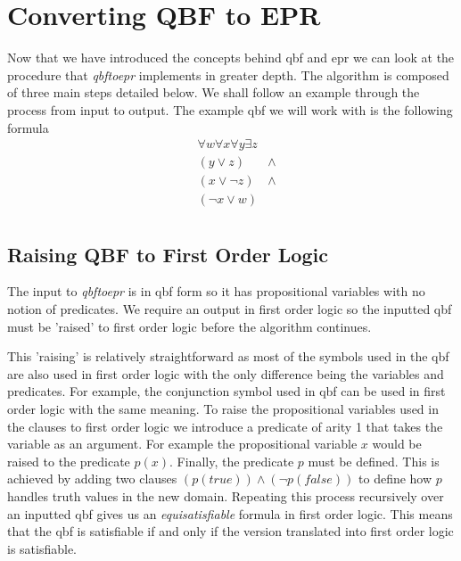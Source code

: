 \chapter{Converting QBF to EPR} \label{chapter:2}
Now that we have introduced the concepts behind \gls{qbf} and \gls{epr} we can look at the procedure that \textit{qbftoepr} implements in greater depth. The algorithm is composed of three main steps detailed below. We shall follow an example through the process from input to output.
The example \gls{qbf} we will work with is the following formula
\begin{equation} \label{qbf:1}
\begin{aligned}
&\forall w \forall x \forall y \exists z \\
&(y \lor z) &\land\\
&(x \lor \neg z) &\land\\
&(\neg x \lor w)\\
\end{aligned}
\end{equation}

\section{Raising QBF to First Order Logic}
The input to \textit{qbftoepr} is in \gls{qbf} form so it has propositional variables with no notion of predicates. We require an output in first order logic so the inputted \gls{qbf} must be 'raised' to first order logic before the algorithm continues.

This 'raising' is relatively straightforward as most of the symbols used in the \gls{qbf} are also used in first order logic with the only difference being the variables and predicates. For example, the conjunction symbol used in \gls{qbf} can be used in first order logic with the same meaning. To raise the propositional variables used in the clauses to first order logic we introduce a predicate of arity 1 that takes the variable as an argument. For example the propositional variable $x$ would be raised to the predicate $p(x)$. Finally, the predicate $p$ must be defined. This is achieved by adding two clauses $(p(true)) \land (\neg p(false))$ to define how $p$ handles truth values in the new domain. Repeating this process recursively over an inputted \gls{qbf} gives us an \textit{equisatisfiable} formula in first order logic. This means that the \gls{qbf} is satisfiable if and only if the version translated into first order logic is satisfiable.

